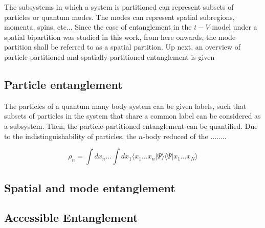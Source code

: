 	The subsystems in which a system is partitioned can represent subsets of particles or quantum modes. The modes can represent spatial subregions, momenta, spins, etc... Since the case of entanglement in the $t-V$ model under a spatial bipartition was studied in this work, from here onwards, the mode partition shall be referred to as a spatial partition. Up next, an overview of particle-partitioned and spatially-partitioned entanglement is given

	\subsection{Particle entanglement}
	
	The particles of a quantum many body system can be given labels, such that subsets of particles in the system that share a common label can be considered as a subsystem. Then, the particle-partitioned entanglement can be quantified. Due to the indistinguishability of particles, the $n$-body reduced of the ........
	
	\begin{equation}
	\rho_{n} = \int dx_n \dots \int dx_1 \langle x_1 \dots x_n \vert\Psi\rangle \langle\Psi\vert x_1 \dots x_N \rangle
	\label{eq:nBodyDensityMatrix}
	\end{equation}
		
 	
	\subsection{Spatial and mode entanglement}
	
	\subsection{Accessible Entanglement}



	

	
